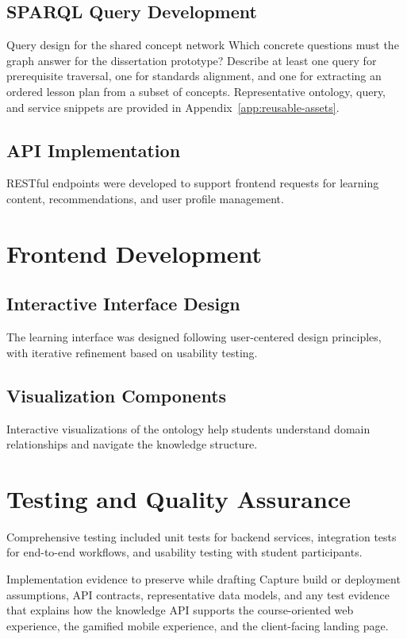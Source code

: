 \subsection{SPARQL Query Development}

\OpenQuestionPrompt
  {Query design for the shared concept network}
  {Which concrete questions must the graph answer for the dissertation prototype? Describe at least one query for prerequisite traversal, one for standards alignment, and one for extracting an ordered lesson plan from a subset of concepts. Representative ontology, query, and service snippets are provided in Appendix~\ref{app:reusable-assets}.}

\subsection{API Implementation}

RESTful endpoints were developed to support frontend requests for learning content, recommendations, and user profile management.

\section{Frontend Development}

\subsection{Interactive Interface Design}

The learning interface was designed following user-centered design principles, with iterative refinement based on usability testing.

\subsection{Visualization Components}

Interactive visualizations of the ontology help students understand domain relationships and navigate the knowledge structure.

\section{Testing and Quality Assurance}

Comprehensive testing included unit tests for backend services, integration tests for end-to-end workflows, and usability testing with student participants.

\EvidencePrompt
  {Implementation evidence to preserve while drafting}
  {Capture build or deployment assumptions, API contracts, representative data models, and any test evidence that explains how the knowledge API supports the course-oriented web experience, the gamified mobile experience, and the client-facing landing page.}
